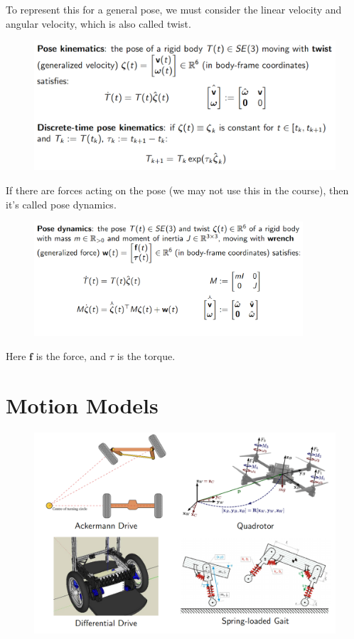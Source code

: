 To represent this for a general pose, we must consider the linear velocity and angular velocity, which is also called twist.

\begin{figure}[h]\centering\includegraphics[width=12cm]{img/j_4_3.png}\end{figure}

If there are forces acting on the pose (we may not use this in the course), then it's called pose dynamics.

\begin{figure}[h]\centering\includegraphics[width=10cm]{img/j_4_4.png}\end{figure}

Here $\textbf{f}$ is the force, and $\tau$ is the torque.

\section{Motion Models}

\begin{figure}[h]\centering\includegraphics[width=12cm]{img/j_4_5.png}\end{figure}

